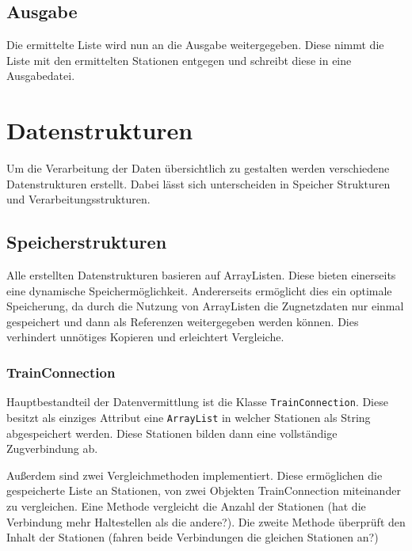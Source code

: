 \subsection{Ausgabe}\label{ver:subsec:ausgabe}
Die ermittelte Liste wird nun an die Ausgabe weitergegeben. Diese nimmt die Liste mit den ermittelten Stationen entgegen und schreibt diese in eine Ausgabedatei.\\

\section{Datenstrukturen}\label{ver:subsec:datenstrukturen}
Um die Verarbeitung der Daten übersichtlich zu gestalten werden verschiedene Datenstrukturen erstellt. Dabei lässt sich unterscheiden in Speicher Strukturen und Verarbeitungsstrukturen.\\
\subsection{Speicherstrukturen}\label{ver:subsec:Speicherstrukturen}
Alle erstellten Datenstrukturen basieren auf ArrayListen. Diese bieten einerseits eine dynamische Speichermöglichkeit. Andererseits ermöglicht dies ein optimale Speicherung, da durch die Nutzung von ArrayListen die Zugnetzdaten nur einmal gespeichert und dann als Referenzen weitergegeben werden können. Dies verhindert unnötiges Kopieren und erleichtert Vergleiche.\\

\subsubsection{TrainConnection}\label{ver:subsubsec:trainconnection}
Hauptbestandteil der Datenvermittlung ist die Klasse \texttt{TrainConnection}. Diese besitzt als einziges Attribut eine \texttt{ArrayList} in welcher Stationen als String abgespeichert werden. Diese Stationen bilden dann eine vollständige  Zugverbindung ab.

Außerdem sind zwei Vergleichmethoden implementiert. Diese ermöglichen die gespeicherte Liste an Stationen, von zwei Objekten TrainConnection
 miteinander zu vergleichen. Eine Methode vergleicht die Anzahl der Stationen (hat die Verbindung mehr Haltestellen als die andere?). Die zweite Methode überprüft den Inhalt der Stationen (fahren beide Verbindungen die gleichen Stationen an?)\\

